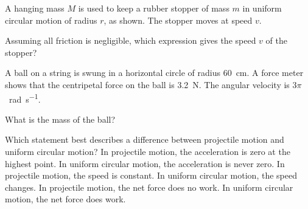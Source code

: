 \begin{quizq}{}
A hanging mass $M$ is used to keep a rubber stopper of mass $m$ in uniform circular motion of radius
$r$, as shown. The stopper moves at speed $v$.
\begin{center}
\end{center}
Assuming all friction is negligible, which expression gives the speed $v$ of the stopper?
\end{quizq}

\begin{quizq}{}
A ball on a string is swung in a horizontal circle of radius \qty{60}{cm}. A force meter shows that
the centripetal force on the ball is \qty{3.2}{N}. The angular velocity is $3\pi$~\si{rad.s^{-1}}.

What is the mass of the ball?
\end{quizq}

\begin{quizq}{}
Which statement best describes a difference between projectile motion and uniform circular motion?
  {In projectile motion, the acceleration is zero at the highest point. In uniform circular
   motion, the acceleration is never zero.}
  {In projectile motion, the speed is constant. In uniform circular motion, the speed changes.}
  {In projectile motion, the net force does no work. In uniform circular motion, the net force does
   work.}
\end{quizq}

